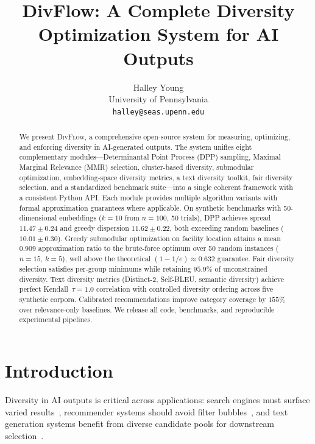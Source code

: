 \documentclass[11pt]{article}
\title{\textbf{DivFlow: A Complete Diversity Optimization System for AI Outputs}}
\author{%
  Halley Young \\
  University of Pennsylvania \\
  \texttt{halley@seas.upenn.edu}
}
\date{}
\begin{document}
\maketitle

\begin{abstract}
We present \textsc{DivFlow}, a comprehensive open-source system for measuring,
optimizing, and enforcing diversity in AI-generated outputs. The system unifies
eight complementary modules---Determinantal Point Process (DPP) sampling,
Maximal Marginal Relevance (MMR) selection, cluster-based diversity,
submodular optimization, embedding-space diversity metrics, a text diversity
toolkit, fair diversity selection, and a standardized benchmark suite---into a
single coherent framework with a consistent Python API. Each module provides
multiple algorithm variants with formal approximation guarantees where
applicable. On synthetic benchmarks with 50-dimensional embeddings ($k{=}10$
from $n{=}100$, 50 trials), DPP achieves spread $11.47{\pm}0.24$ and greedy
dispersion $11.62{\pm}0.22$, both exceeding random baselines
($10.01{\pm}0.30$). Greedy submodular optimization on facility location
attains a mean $0.909$ approximation ratio to the brute-force optimum over
50 random instances ($n{=}15$, $k{=}5$), well above the theoretical
$(1{-}1/e){\approx}0.632$ guarantee. Fair diversity selection satisfies
per-group minimums while retaining $95.9\%$ of unconstrained diversity.
Text diversity metrics (Distinct-2, Self-BLEU, semantic diversity) achieve
perfect Kendall~$\tau{=}1.0$ correlation with controlled diversity ordering
across five synthetic corpora. Calibrated recommendations improve category
coverage by $155\%$ over relevance-only baselines. We release all code,
benchmarks, and reproducible experimental pipelines.
\end{abstract}

\section{Introduction}
\label{sec:intro}

Diversity in AI outputs is critical across applications: search engines must
surface varied results~\citep{carbonell1998mmr}, recommender systems should
avoid filter bubbles~\citep{pariser2011filter}, and text generation systems
benefit from diverse candidate pools for downstream
selection~\citep{ippolito2019comparison,vijayakumar2018diverse}.
\end{document}
